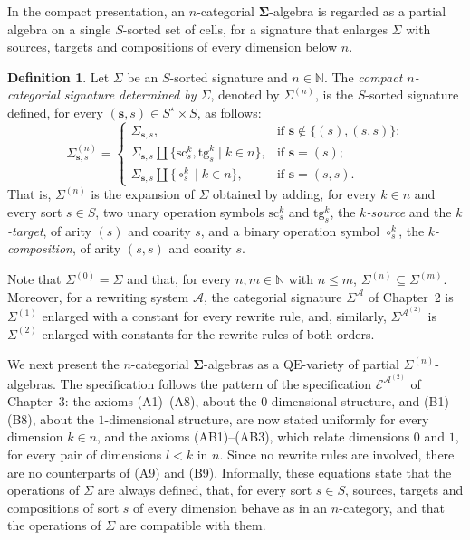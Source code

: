 \documentclass{amsart}
\theoremstyle{plain}
\theoremstyle{definition}
\newtheorem{definition}[theorem]{Definition}
\begin{document}
In the compact presentation, an $n$-categorial $\mathbf{\Sigma}$-algebra is regarded as a partial algebra on a single $S$-sorted set of cells, for a signature that enlarges $\Sigma$ with sources, targets and compositions of every dimension below $n$.

\begin{definition}\label{DSigmaCatCompact}
Let $\Sigma$ be an $S$-sorted signature and $n\in\mathbb{N}$. The \emph{compact $n$-categorial signature determined by $\Sigma$}, denoted by $\Sigma^{(n)}$, is the $S$-sorted signature defined, for every $(\mathbf{s},s)\in S^{\star}\times S$, as follows:
$$
{\Sigma}^{(n)}_{\mathbf{s},s}=
\begin{cases}
{\Sigma}_{\mathbf{s},s},
& \text{if $\mathbf{s}\not\in \{(s),(s,s)\}$;}\\
{\Sigma}_{\mathbf{s},s}\amalg\{\mathrm{sc}^{k}_{s}, \mathrm{tg}^{k}_{s}\mid k\in n\},
& \text{if $\mathbf{s}= (s)$;}\\
{\Sigma}_{\mathbf{s},s}\amalg\{\circ^{k}_{s}\mid k\in n\},
& \text{if $\mathbf{s}= (s,s)$.}
\end{cases}
$$
That is, ${\Sigma}^{(n)}$ is the expansion of $\Sigma$ obtained by adding, for every $k\in n$ and every sort $s\in S$, two unary operation symbols $\mathrm{sc}^{k}_{s}$ and $\mathrm{tg}^{k}_{s}$, the \emph{$k$-source} and the \emph{$k$-target}, of arity $(s)$ and coarity $s$, and a binary operation symbol $\circ^{k}_{s}$, the \emph{$k$-composition}, of arity $(s,s)$ and coarity $s$.
\end{definition}

Note that $\Sigma^{(0)}=\Sigma$ and that, for every $n,m\in\mathbb{N}$ with $n\leq m$, $\Sigma^{(n)}\subseteq\Sigma^{(m)}$. Moreover, for a rewriting system $\boldsymbol{\mathcal{A}}$, the categorial signature $\Sigma^{\boldsymbol{\mathcal{A}}}$ of Chapter~2 is $\Sigma^{(1)}$ enlarged with a constant for every rewrite rule, and, similarly, $\Sigma^{\boldsymbol{\mathcal{A}}^{(2)}}$ is $\Sigma^{(2)}$ enlarged with constants for the rewrite rules of both orders.

We next present the $n$-categorial $\mathbf{\Sigma}$-algebras as a $\mathrm{QE}$-variety of partial $\Sigma^{(n)}$-algebras. The specification follows the pattern of the specification $\boldsymbol{\mathcal{E}}^{\boldsymbol{\mathcal{A}}^{(2)}}$ of Chapter~3: the axioms (A1)--(A8), about the $0$-dimensional structure, and (B1)--(B8), about the $1$-dimensional structure, are now stated uniformly for every dimension $k\in n$, and the axioms (AB1)--(AB3), which relate dimensions $0$ and $1$, for every pair of dimensions $l<k$ in $n$. Since no rewrite rules are involved, there are no counterparts of (A9) and (B9). Informally, these equations state that the operations of $\Sigma$ are always defined, that, for every sort $s\in S$, sources, targets and compositions of sort $s$ of every dimension behave as in an $n$-category, and that the operations of $\Sigma$ are compatible with them.
\end{document}
